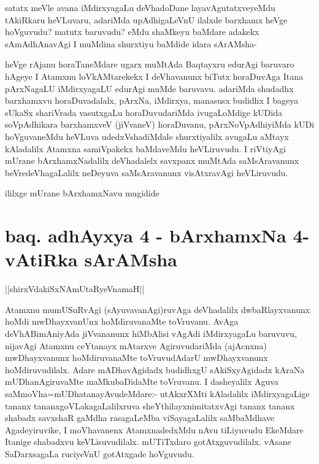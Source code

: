 \begin{artha}
satatx meVle avana iMdirxyagaLu deVhadoDane layavAgutatxveyeMdu tAkiRkaru heVLuvaru, adariMda upAdhigaLeVnU ilalxde barxhamx heVge hoVguvudu? matutx baruvudu? eMdu shaMkeyu baMdare adakekx sAmAdhAnavAgi I muMdina shurxtiyu baMdide \stext idara sArAMsha-
\end{artha}

\begin{artha}
heVge rAjanu horaTaneMdare ugarx muMtAda Baqtayxru edurAgi baruvaro hAgeye I Atamxnu loVkAMtarekekx I deVhavanunx biTutx horaDuvAga Itana pArxNagaLU iMdirxyagaLU edurAgi muMde baruvavu. adariMda shudadhx barxhamxvu horaDuvadalalx, pArxNa, iMdirxya, manasusx budidhx I bageya sUkaSx shariVrada vasutxgaLu horaDuvudariMda ivugaLoMdige kUDida soVpAdhikara barxhamxveV (jiVvaneV) horaDuvanu, pArxNoVpAdhiyiMda kUDi hoVguvaneMdu heVLuva udedxVshadiMdale shurxtiyalilx avugaLu aMtayx kAladalilx Atamxna samiVpakekx baMdaveMdu heVLiruvudu. I riVtiyAgi mUrane bArxhamxNadalilx deVhadalelx savxpanx muMtAda saMsAravanunx beVredeVhagaLalilx neDeyuva saMsAravanunx visAtxravAgi heVLiruvudu.
\end{artha}

\begin{center}
ililxge mUrane bArxhamxNavu mugidide
\end{center}

\section*{baq. adhAyxya 4 - bArxhamxNa 4-vAtiRka sArAMsha}

\begin{center}
||shirxVdakiSxNAmUtaRyeVnamaH||
\end{center}


\begin{artha}
Atamxnu mumUSuRvAgi (sAyuvavanAgi)ruvAga deVhadalilx dwbaRlayxvanunx hoMdi mwDhayxvanUnx hoMdiruvanaMte toVruvanu. AvAga deVhABimAniyAda jiVvananunx hiMbAlisi vAgAdi iMdirxyagaLu baruvuvu, nijavAgi Atamxnu ceYtanayx mAtarxve AgiruvudariMda (ajAcnxna) mwDhayxvanunx hoMdiruvanaMte toVruvudAdarU mwDhayxvanunx hoMdiruvudilalx. Adare mADhavAgidadx budidhxgU sAkiSxyAgidadx kAraNa mUDhanAgiruvaMte maMkubaDidaMte toVruvanu. I dasheyalilx Aguva saMmoVha=mUDhatanayAvudeMdare:- utAkxrXMti kAladalilx iMdirxyagaLige tananx tananxgoVLakagaLalilxruva sheYthilayxnimitatxvAgi tananx tananx shabadx savxshaR gaMdha rasagaLeMba viSayagaLalilx saMbaMdhave Agadeyiruvike, I moVhavanenx AtamxnadedxMdu nAvu tiLiyuvudu EkeMdare Itanige shabadxvu keVLisuvudilalx. mUTiTxdaro gotAtxguvudilalx. vAsane SaDarxsagaLa ruciyeVnU gotAtxgade hoVguvudu.  
\end{artha}

